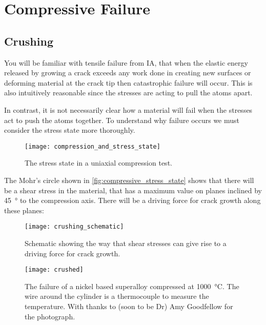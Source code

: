 \section{Compressive Failure}

\subsection{Crushing}

You will be familiar with tensile failure from IA, that when the elastic energy released by growing a crack exceeds any work done in creating new surfaces or deforming material at the crack tip then catastrophic failure will occur. This is also intuitively reasonable since the stresses are acting to pull the atoms apart.

In contrast, it is not necessarily clear how a material will fail when the stresses act to push the atoms together. To understand why failure occurs we must consider the stress state more thoroughly.

\FloatBarrier
\begin{figure}[h!]
\centering
\texttt{[image: compression\_and\_stress\_state]}
\caption{The stress state in a uniaxial compression test.\label{fig:compressive_stress_state}}
\end{figure}

\FloatBarrier

The Mohr's circle shown in \autoref{fig:compressive_stress_state} shows that there will be a shear stress in the material, that has a maximum value on planes inclined by \SI{45}{\degree} to the compression axis. There will be a driving force for crack growth along these planes:

\FloatBarrier
\begin{figure}
\centering
\texttt{[image: crushing\_schematic]}
\caption{Schematic showing the way that shear stresses can give rise to a driving force for crack growth.}
\end{figure}

\FloatBarrier

\FloatBarrier
\begin{figure}[h!]
\centering
\texttt{[image: crushed]}
\caption{The failure of a nickel based superalloy compressed at \SI{1000}{\celsius}. The wire around the cylinder is a thermocouple to measure the temperature. With thanks to (soon to be Dr) Amy Goodfellow for the photograph.\label{fig:crushed}}
\end{figure}

